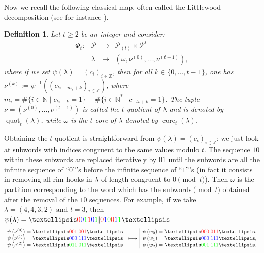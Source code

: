 \documentclass[11pt,letterpaper]{amsart}
\def\bbbz{\mathbb Z}
\DeclareMathOperator{\core}{core}
\DeclareMathOperator{\quot}{quot}
\newtheorem{df}{Definition}[section]
\newcommand{\N}{\mathbb{N}}
\numberwithin{equation}{section}
\numberwithin{df}{section}
\begin{document}
Now we recall the following classical map, often called the Littlewood decomposition (see for instance \cite{GKS,HJ}).

\begin{df}\label{defphi}{\em
 Let $t \geq 2$ be an integer and consider:\\
$$\begin{array}{l|rcl}
\Phi_t: & \mathcal{P} & \to & \mathcal{P}_{(t)} \times \mathcal{P}^t \\
& \lambda & \mapsto & (\omega,\nu^{(0)},\ldots,\nu^{(t-1)}),
\end{array}$$
where if we set $\psi(\lambda)=\left(c_i\right)_{i\in\bbbz}$, then for all $k\in\lbrace 0,\dots,t-1\rbrace$, one has \linebreak $\nu^{(k)}:=\psi^{-1}\left(\left(c_{ti+m_i+k}\right)_{i\in\bbbz}\right)$, where $m_i=\#\lbrace i\in\N \mid c_{ti+k}=1\rbrace-\#\lbrace i\in\N^* \mid c_{-ti+k}=1\rbrace$. The tuple $\underline{\nu}=\left(\nu^{(0)},\ldots,\nu^{(t-1)}\right)$ is called the $t$-quotient of $\lambda$ and is denoted by \textit{$\quot_t(\lambda)$}, while $\omega$ is the $t$-core of $\lambda$ denoted by \textit{$\core_t(\lambda)$}.}
\end{df}
Obtaining the $t$-quotient is straightforward from $\psi(\lambda)=\left(c_i\right)_{i\in\bbbz}$: we just look at subwords with indices congruent to the same values modulo $t$. The sequence $10$ within these subwords are replaced iteratively by $01$ until the subwords are all the infinite sequence of ``$0$'''s before the infinite sequence of ``$1$'''s (in fact it consists in removing all rim hooks in $\lambda$ of length congruent to $0\pmod t$). Then $\omega$ is the partition corresponding to the word which has the subwords$\pmod t$ obtained after the removal of the $10$ sequences.
For example, if we take $\lambda = (4,4,3,2) \text{ and } t=3$, then $\psi(\lambda)=\ldots \color{red}{0} \color{blue}{0} \color{green}{1} \color{red}{1} \color{blue}{0}\color{green}{1} \color{black}| \color{red}{0} \color{blue}{1} \color{green}{0} \color{red}{0} \color{blue}{1} \color{green}{1}\color{black}\ldots$
\begin{align*}
\begin{array}{rc|rcl}
\psi\left(\nu^{(0)}\right)=\ldots \color{red} 001 \color{black}| \color{red}001\color{black}\ldots& &\psi\left(w_{0}\right)=\ldots \color{red} 000 \color{black}| \color{red}011\color{black}\ldots,\\
 \psi\left(\nu^{(1)}\right)=\ldots \color{blue} 000 \color{black}| \color{blue}111\color{black}\ldots& \longmapsto& \psi\left(w_{1}\right)=\ldots \color{blue} 000 \color{black}| \color{blue}111\color{black}\ldots , \\
 \psi\left(\nu^{(2)}\right)=\ldots \color{green} 011 \color{black}| \color{green}011\color{black}\ldots & & \psi\left(w_{2}\right)=\ldots \color{green} 001 \color{black}| \color{green}111\color{black}\ldots .
\end{array}\\
\end{align*}
\end{document}
